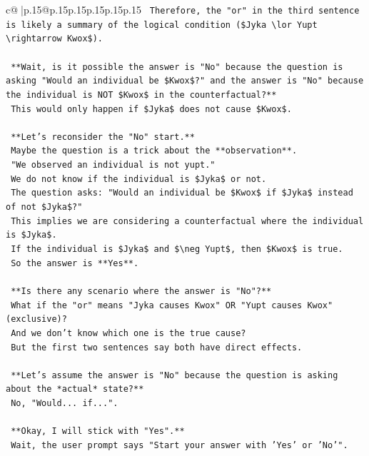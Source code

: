 \documentclass{article}
\begin{document}
{\begin{supertabular}{c@{$\;$}|p{.15\linewidth}@{}p{.15\linewidth}p{.15\linewidth}p{.15\linewidth}p{.15\linewidth}p{.15\linewidth}}
{{{\texttt{    Therefore, the "or" in the third sentence is likely a summary of the logical condition (\$Jyka \textbackslash{}lor Yupt \textbackslash{}rightarrow Kwox\$).} \\
\\ 
\texttt{    **Wait, is it possible the answer is "No" because the question is asking "Would an individual be \$Kwox\$?" and the answer is "No" because the individual is NOT \$Kwox\$ in the counterfactual?**} \\
\texttt{    This would only happen if \$Jyka\$ does not cause \$Kwox\$.} \\
\\ 
\texttt{    **Let's reconsider the "No" start.**} \\
\texttt{    Maybe the question is a trick about the **observation**.} \\
\texttt{    "We observed an individual is not yupt."} \\
\texttt{    We do not know if the individual is \$Jyka\$ or not.} \\
\texttt{    The question asks: "Would an individual be \$Kwox\$ if \$Jyka\$ instead of not \$Jyka\$?"} \\
\texttt{    This implies we are considering a counterfactual where the individual is \$Jyka\$.} \\
\texttt{    If the individual is \$Jyka\$ and \$\textbackslash{}neg Yupt\$, then \$Kwox\$ is true.} \\
\texttt{    So the answer is **Yes**.} \\
\\ 
\texttt{    **Is there any scenario where the answer is "No"?**} \\
\texttt{    What if the "or" means "Jyka causes Kwox" OR "Yupt causes Kwox" (exclusive)?} \\
\texttt{    And we don't know which one is the true cause?} \\
\texttt{    But the first two sentences say both have direct effects.} \\
\\ 
\texttt{    **Let's assume the answer is "No" because the question is asking about the *actual* state?**} \\
\texttt{    No, "Would... if...".} \\
\\ 
\texttt{    **Okay, I will stick with "Yes".**} \\
\texttt{    Wait, the user prompt says "Start your answer with 'Yes' or 'No'".} \\
}}}
\end{supertabular}}
\end{document}
